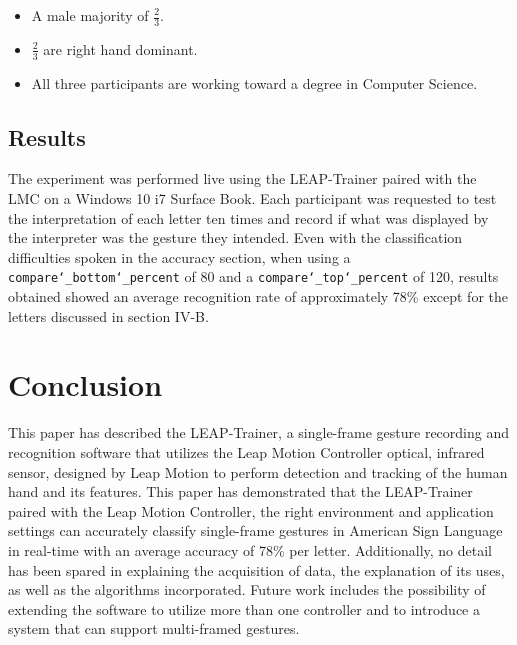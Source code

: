 \documentclass[letterpaper, 10 pt, conference]{ieeeconf}
\begin{document}
\begin{itemize}
\item A male majority of $\frac{2}{3}$. 
\item $\frac{2}{3}$ are right hand dominant.
\item All three participants are working toward a degree in Computer Science.
\end{itemize}
\vspace{5pt}

\subsection{Results}

The experiment was performed live using the LEAP-Trainer paired with the LMC on a Windows 10 i7 Surface Book. Each participant was requested to test the interpretation of each letter ten times and record if what was displayed by the interpreter was the gesture they intended. Even with the classification difficulties spoken in the accuracy section, when using a \texttt{compare\char`_bottom\char`_percent} of 80 and a \texttt{compare\char`_top\char`_percent} of 120, results obtained showed an average recognition rate of approximately 78\% except for the letters discussed in section IV-B.




\section{Conclusion}

This paper has described the LEAP-Trainer, a single-frame gesture recording and recognition software that utilizes the Leap Motion Controller optical, infrared sensor, designed by Leap Motion to perform detection and tracking of the human hand and its features. This paper has demonstrated that the LEAP-Trainer paired with the Leap Motion Controller, the right environment and application settings can accurately classify single-frame gestures in American Sign Language in real-time with an average accuracy of 78\% per letter. Additionally, no detail has been spared in explaining the acquisition of data, the explanation of its uses, as well as the algorithms incorporated. Future work includes the possibility of extending the software to utilize more than one controller and to introduce a system that can support multi-framed gestures. 


\end{document}
